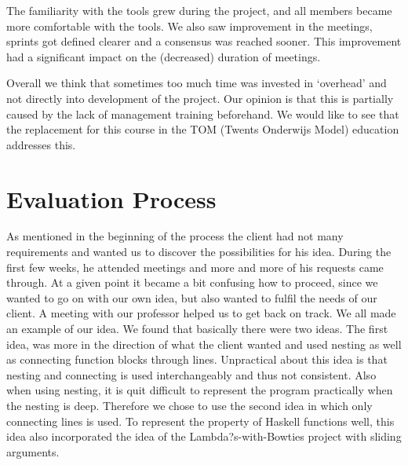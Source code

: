 The familiarity with the tools grew during the project, and all members became more comfortable with the tools. We also saw improvement in the meetings, sprints got defined clearer and a consensus was reached sooner. This improvement had a significant impact on the (decreased) duration of meetings.

Overall we think that sometimes too much time was invested in `overhead' and not directly into development of the project. Our opinion is that this is partially caused by the lack of management training beforehand. We would like to see that the replacement for this course in the TOM (Twents Onderwijs Model) education addresses this.

\section{Evaluation Process}

As mentioned in the beginning of the process the client had not many requirements and wanted us to discover the possibilities for his idea.
During the first few weeks, he attended meetings and more and more of his requests came through.  At a given point it became a bit confusing how to proceed, since we wanted to go on with our own idea, but also wanted to fulfil the needs of our client.
A meeting with our professor helped us to get back on track. We all made an example of our idea. We found that basically there were two ideas. The first idea, was more in the direction of what the client wanted and used nesting as well as connecting function blocks through lines. Unpractical about this idea is that nesting and connecting is used interchangeably and thus not consistent. Also when using nesting, it is quit difficult to represent the program practically when the nesting is deep.
Therefore we chose to use the second idea in which only connecting lines is used. To represent the property of Haskell functions well, this idea also incorporated the idea of the Lambda?s-with-Bowties project with sliding arguments.

